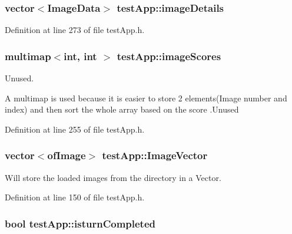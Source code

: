 \hypertarget{classtest_app_adcd4c3dfc7257326a79e6a3fc8b33406}{
\subsubsection[{image\-Details}]{\setlength{\rightskip}{0pt plus 5cm}vector$<${\bf Image\-Data}$>$ test\-App\-::image\-Details}}\label{classtest_app_adcd4c3dfc7257326a79e6a3fc8b33406}


Definition at line 273 of file test\-App.\-h.

\hypertarget{classtest_app_a9ced1a64554a911109fe8a975b95b590}{
\subsubsection[{image\-Scores}]{\setlength{\rightskip}{0pt plus 5cm}multimap$<$int, int $>$ test\-App\-::image\-Scores}}\label{classtest_app_a9ced1a64554a911109fe8a975b95b590}


Unused. 

A multimap is used because it is easier to store 2 elements(\-Image number and index) and then sort the whole array based on the score .Unused 

Definition at line 255 of file test\-App.\-h.

\hypertarget{classtest_app_ad4de5d6e6e8f3b8bb7424e62792deb1f}{
\subsubsection[{Image\-Vector}]{\setlength{\rightskip}{0pt plus 5cm}vector$<$of\-Image$>$ test\-App\-::\-Image\-Vector}}\label{classtest_app_ad4de5d6e6e8f3b8bb7424e62792deb1f}


Will store the loaded images from the directory in a Vector. 



Definition at line 150 of file test\-App.\-h.

\hypertarget{classtest_app_a42478a80a90ce9f663c04bcdaea5c5bd}{
\subsubsection[{isturn\-Completed}]{\setlength{\rightskip}{0pt plus 5cm}bool test\-App\-::isturn\-Completed}}\label{classtest_app_a42478a80a90ce9f663c04bcdaea5c5bd}


